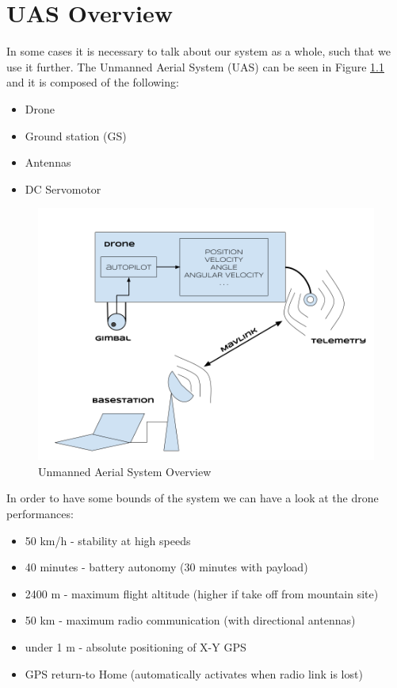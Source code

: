 \chapter{UAS Overview}\label{ch:uas}

In some cases it is necessary to talk about our system as a whole, such that we use it further. The Unmanned Aerial System (UAS) can be seen in Figure \ref{fig:uas} and it is composed of the following:
\begin{itemize}
	\item Drone
	\item Ground station (GS)
	\item Antennas
	\item DC Servomotor
\end{itemize}

\begin{figure}[H]
	\centering
	\includegraphics[scale=0.33]{figures/uas.png}
	\caption{Unmanned Aerial System Overview}
	\label{fig:uas}
\end{figure}

In order to have some bounds of the system we can have a look at the drone performances:
\begin{itemize}
	\item 50 km/h - stability at high speeds 
	\item 40 minutes - battery autonomy (30 minutes with payload)
	\item 2400 m - maximum flight altitude (higher if take off from mountain site)
	\item 50 km - maximum radio communication (with directional antennas)
	\item under 1 m - absolute positioning of X-Y GPS
	\item GPS return-to Home (automatically activates when radio link is lost)
\end{itemize}


